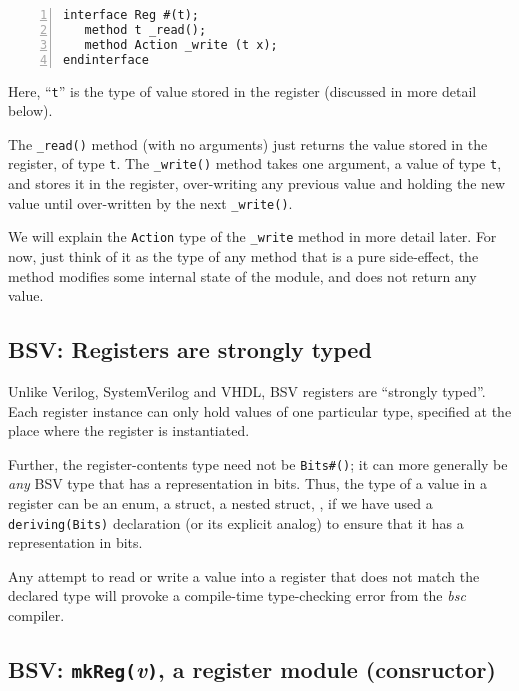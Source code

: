 {\small
\begin{Verbatim}[frame=single, numbers=left]
interface Reg #(t);
   method t _read();
   method Action _write (t x);
endinterface
\end{Verbatim}
}

Here, ``\verb|t|'' is the type of value stored in the register
(discussed in more detail below).

The \verb|_read()| method (with no arguments) just returns the value
stored in the register, of type \verb|t|.  The \verb|_write()| method
takes one argument, a value of type \verb|t|, and stores it in the
register, over-writing any previous value and holding the new value
until over-written by the next \verb|_write()|.


We will explain the {\tt Action} type of the {\tt \_write} method in
more detail later.  For now, just think of it as the type of any
method that is a pure side-effect, {\ie} the method modifies some
internal state of the module, and does not return any value.


\subsection{BSV: Registers are strongly typed}


Unlike Verilog, SystemVerilog and VHDL, BSV registers are ``strongly
typed''.  Each register instance can only hold values of one
particular type, specified at the place where the register is
instantiated.

Further, the register-contents type need not be \verb|Bits#()|; it can
more generally be \emph{any} BSV type that has a representation in
bits.  Thus, the type of a value in a register can be an enum, a
struct, a nested struct, {\etc}, if we have used a
\verb|deriving(Bits)| declaration (or its explicit analog) to ensure
that it has a representation in bits.

Any attempt to read or write a value into a register that does not
match the declared type will provoke a compile-time type-checking
error from the \emph{bsc} compiler.


\subsection{BSV: {\tt mkReg(}\emph{v}{\tt )}, a register module (consructor)}

